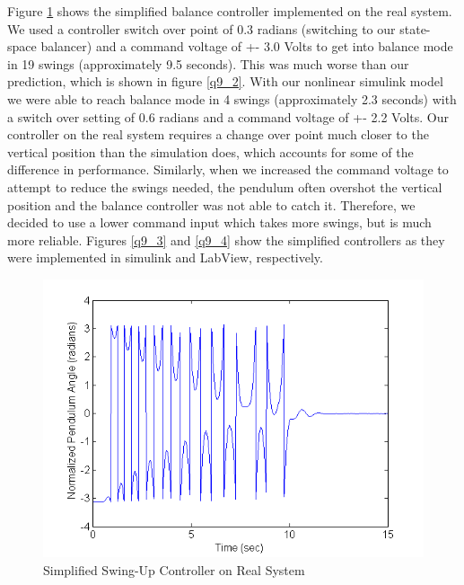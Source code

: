 \documentclass{article}
\theoremstyle{plain}
\theoremstyle{definition}
\theoremstyle{remark}
\begin{document}
Figure \ref{q9_1} shows the simplified balance controller implemented on the real system. We used a controller switch over point of 0.3 radians (switching to our state-space balancer) and a command voltage of +- 3.0 Volts to get into balance mode in 19 swings (approximately 9.5 seconds). This was much worse than our prediction, which is shown in figure \ref{q9_2}. With our nonlinear simulink model we were able to reach balance mode in 4 swings (approximately 2.3 seconds) with a switch over setting of 0.6 radians and a command voltage of +- 2.2 Volts. Our controller on the real system requires a change over point much closer to the vertical position than the simulation does, which accounts for some of the difference in performance. Similarly, when we increased the command voltage to attempt to reduce the swings needed, the pendulum often overshot the vertical position and the balance controller was not able to catch it. Therefore, we decided to use a lower command input which takes more swings, but is much more reliable. Figures \ref{q9_3} and \ref{q9_4} show the simplified controllers as they were implemented in simulink and LabView, respectively.\\

\begin{figure}[hbt]
\begin{center}
\includegraphics[width = 13cm]{Q9.png}
\end{center}
\caption{Simplified Swing-Up Controller on Real System}
\label{q9_1}
\end{figure}
\end{document}
